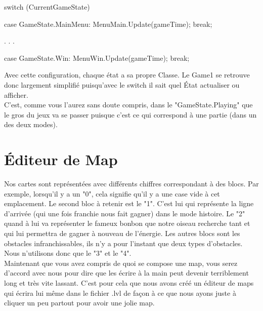 \documentclass [11pt]{report}
\begin{document}
		
		\begin{mylisting}
	switch (CurrentGameState)
	{
		case GameState.MainMenu:
			MenuMain.Update(gameTime);
			break;
			
			.
			.
			.
			
		case GameState.Win:
			MenuWin.Update(gameTime);
			break;
	}
				\end{mylisting}
		
		\vspace{10mm}
		
		Avec cette configuration, chaque état a sa propre Classe. Le Game1 se retrouve donc largement simplifié puisqu'avec le switch il sait quel État actualiser ou afficher.\\
		
			
		C'est, comme vous l'aurez sans doute compris, dans le "GameState.Playing" que le gros du jeux va se passer puisque c'est ce qui correspond à une partie (dans un des deux modes).
		
		
		\vspace{10mm}
		\newpage
		
		
		
	\section{\'Editeur de Map}
						
			Nos cartes sont représentées avec différents chiffres correspondant à des blocs. Par exemple, lorsqu'il y a un "0", cela signifie qu'il y a une case vide à cet emplacement. Le second bloc à retenir est le "1". C'est lui qui représente la ligne d'arrivée (qui une fois franchie nous fait gagner) dans le mode histoire. Le "2" quand à lui va représenter le fameux bonbon que notre oiseau recherche tant et qui lui permettra de gagner à nouveau de l'énergie. Les autres blocs sont les obstacles infranchissables, ils n'y a pour l'instant que deux types d'obstacles. Nous n'utilisons donc que le "3" et le "4".\\
			
			\indent Maintenant que vous avez compris de quoi se compose une map, vous serez d'accord avec nous pour dire que les écrire à la main peut devenir terriblement long et très vite lassant. C'est pour cela que nous avons créé un éditeur de maps qui écrira lui même dans le fichier .lvl de façon à ce que nous ayons juste à cliquer un peu partout pour avoir une jolie map.
			
			\vspace{10mm}
			
\end{document}
